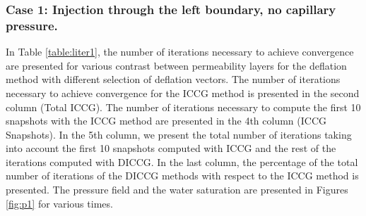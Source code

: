 \documentclass[12pt]{article}
\begin{document}
\subsubsection*{Case 1: Injection through the left boundary, no capillary pressure.}
In Table \ref{table:liter1}, the number of iterations necessary to achieve convergence are presented for various contrast between permeability layers for the deflation method with different selection of deflation vectors. The number of iterations necessary to achieve convergence for the ICCG method is presented in the second column (Total ICCG). The number of iterations necessary to compute the first 10 snapshots with the ICCG method are presented in the 4th column (ICCG Snapshots). In the 5th column, we present the total number of iterations taking into account the first 10 snapshots computed with ICCG and the rest of the iterations computed with DICCG. In the last column, the percentage of the total number of iterations of the DICCG methods with respect to the ICCG method is presented.   
The pressure field and the water saturation are presented in Figures \ref{fig:p1} for various times.
\end{document}

